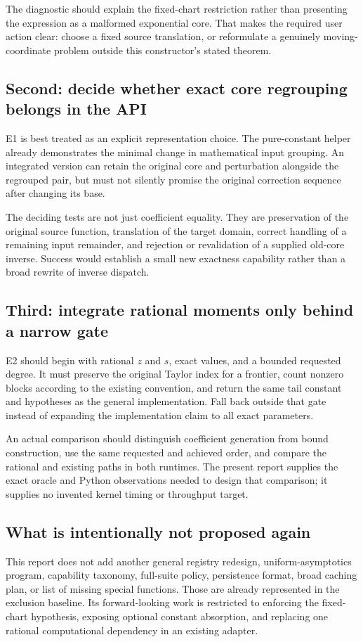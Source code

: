 \documentclass[11pt,letterpaper]{article}
\begin{document}
The diagnostic should explain the fixed-chart restriction rather than presenting the expression as a malformed exponential core. That makes the required user action clear: choose a fixed source translation, or reformulate a genuinely moving-coordinate problem outside this constructor's stated theorem.

\subsection{Second: decide whether exact core regrouping belongs in the API}
E1 is best treated as an explicit representation choice. The pure-constant helper already demonstrates the minimal change in mathematical input grouping. An integrated version can retain the original core and perturbation alongside the regrouped pair, but must not silently promise the original correction sequence after changing its base.

The deciding tests are not just coefficient equality. They are preservation of the original source function, translation of the target domain, correct handling of a remaining input remainder, and rejection or revalidation of a supplied old-core inverse. Success would establish a small new exactness capability rather than a broad rewrite of inverse dispatch.

\subsection{Third: integrate rational moments only behind a narrow gate}
E2 should begin with rational $z$ and $s$, exact values, and a bounded requested degree. It must preserve the original Taylor index for a frontier, count nonzero blocks according to the existing convention, and return the same tail constant and hypotheses as the general implementation. Fall back outside that gate instead of expanding the implementation claim to all exact parameters.

An actual comparison should distinguish coefficient generation from bound construction, use the same requested and achieved order, and compare the rational and existing paths in both runtimes. The present report supplies the exact oracle and Python observations needed to design that comparison; it supplies no invented kernel timing or throughput target.

\subsection{What is intentionally not proposed again}
This report does not add another general registry redesign, uniform-asymptotics program, capability taxonomy, full-suite policy, persistence format, broad caching plan, or list of missing special functions. Those are already represented in the exclusion baseline. Its forward-looking work is restricted to enforcing the fixed-chart hypothesis, exposing optional constant absorption, and replacing one rational computational dependency in an existing adapter.\cite{register,wave3,wave4,wave5}
\end{document}
